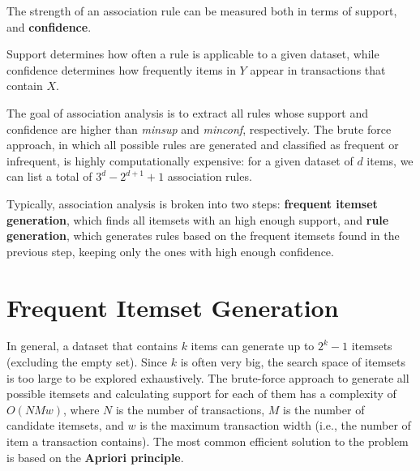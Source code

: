 The strength of an association rule can be measured both in terms of support, and \textbf{confidence}.


Support determines how often a rule is applicable to a given dataset, while confidence determines how frequently items in $Y$ appear in transactions that contain $X$.

The goal of association analysis is to extract all rules whose support and confidence are higher than \textit{minsup} and \textit{minconf}, respectively. The brute force approach, in which all possible rules are generated and classified as frequent or infrequent, is highly computationally expensive: for a given dataset of $d$ items, we can list a total of $3^d - 2^{d+1} + 1$ association rules.

Typically, association analysis is broken into two steps: \textbf{frequent itemset generation}, which finds all itemsets with an high enough support, and \textbf{rule generation}, which generates rules based on the frequent itemsets found in the previous step, keeping only the ones with high enough confidence.

\section{Frequent Itemset Generation}

In general, a dataset that contains $k$ items can generate up to $2^k - 1$ itemsets (excluding the empty set). Since $k$ is often very big, the search space of itemsets is too large to be explored exhaustively. The brute-force approach to generate all possible itemsets and calculating support for each of them has a complexity of $O(NMw)$, where $N$ is the number of transactions, $M$ is the number of candidate itemsets, and $w$ is the maximum transaction width (i.e., the number of item a transaction contains). The most common efficient solution to the problem is based on the \textbf{Apriori principle}.

